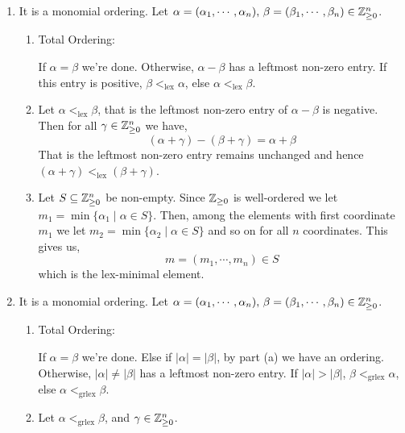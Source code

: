 \documentclass[Notebook.tex]{subfiles}
\begin{document}
\begin{solution}
    \bbni
    \begin{enumerate}[label=(\alph*),ref=\theenumi\alph*]
        \item It is a monomial ordering. 
        Let $\alpha = (\alpha_1, \cdots, \alpha_n), \, \beta = (\beta_1, \cdots, \beta_n) \in \mathbb Z_{\geq 0}^n$. 
        \begin{enumerate}
            \item [(i)] Total Ordering: 
            
            If $\alpha = \beta$ we're done. Otherwise, $\alpha - \beta$ has a leftmost non-zero entry. If this entry is positive, $\beta <_{\text{lex}} \alpha$, else $\alpha <_{\text{lex}} \beta$. 

            \item [(ii)] Let $\alpha <_\text{lex} \beta$, that is the leftmost non-zero entry of $\alpha - \beta$ is negative. Then for all $\gamma \in \mathbb Z_{\geq 0}^n$ we have, 
            \[(\alpha + \gamma) - (\beta + \gamma) = \alpha + \beta\]
            That is the leftmost non-zero entry remains unchanged and hence $(\alpha + \gamma) <_\text{lex} (\beta + \gamma)$. 

            \item [(iii)] Let $S \subseteq \mathbb Z_{\geq 0}^n$ be non-empty. Since $\mathbb Z_{\geq 0}$ is well-ordered we let $m_1 = \min \{\alpha_1 \mid \alpha \in S\}$. Then, among the elements with first coordinate $m_1$ we let $m_2 = \min \{\alpha_2 \mid \alpha \in S\}$ and so on for all $n$ coordinates. This gives us, 
            \[ m = (m_1, \cdots, m_n) \in S\]
            which is the lex-minimal element. 
        \end{enumerate}

        \item It is a monomial ordering. 
        Let $\alpha = (\alpha_1, \cdots, \alpha_n), \, \beta = (\beta_1, \cdots, \beta_n) \in \mathbb Z_{\geq 0}^n$. 
        \begin{enumerate}
            \item [(i)] Total Ordering: 
            
            If $\alpha = \beta$ we're done. 
            Else if $|\alpha| = |\beta|$, by part (a) we have an ordering. 
            Otherwise, $|\alpha| \neq |\beta|$ has a leftmost non-zero entry. If $|\alpha| > |\beta|$, $\beta <_{\text{grlex}} \alpha$, else $\alpha <_{\text{grlex}} \beta$. 

            \item [(ii)] Let $\alpha <_\text{grlex} \beta$, and $\gamma \in \mathbb Z_{\geq 0}^n$. 
            

\end{enumerate}
\end{enumerate}
\end{solution}
\end{document}
